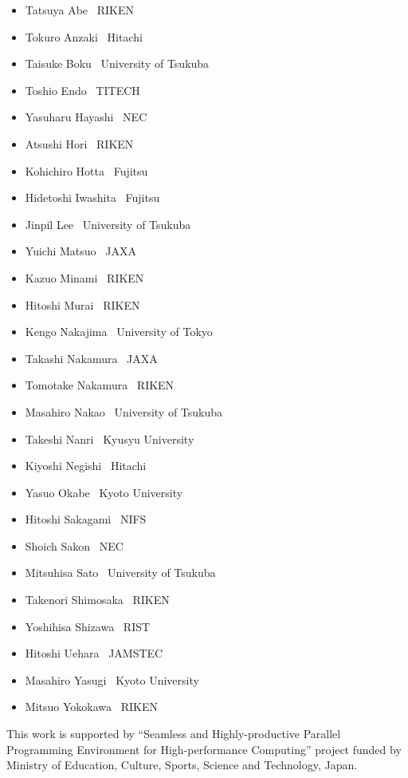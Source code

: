 \documentclass[a4paper,11pt]{report}
\begin{document}
\begin{itemize}
\setlength{\itemsep}{-1mm}
\item Tatsuya Abe        \dotfill \ RIKEN
\item Tokuro Anzaki      \dotfill \ Hitachi
\item Taisuke Boku       \dotfill \ University of Tsukuba
\item Toshio Endo        \dotfill \ TITECH
\item Yasuharu Hayashi   \dotfill \ NEC
\item Atsushi Hori       \dotfill \ RIKEN
\item Kohichiro Hotta    \dotfill \ Fujitsu
\item Hidetoshi Iwashita \dotfill \ Fujitsu
\item Jinpil Lee         \dotfill \ University of Tsukuba
\item Yuichi Matsuo      \dotfill \ JAXA
\item Kazuo Minami       \dotfill \ RIKEN
\item Hitoshi Murai      \dotfill \ RIKEN
\item Kengo Nakajima     \dotfill \ University of Tokyo
\item Takashi Nakamura   \dotfill \ JAXA
\item Tomotake Nakamura  \dotfill \ RIKEN
\item Masahiro Nakao     \dotfill \ University of Tsukuba
\item Takeshi Nanri      \dotfill \ Kyusyu University
\item Kiyoshi Negishi    \dotfill \ Hitachi
\item Yasuo Okabe        \dotfill \ Kyoto University
\item Hitoshi Sakagami   \dotfill \ NIFS
\item Shoich Sakon       \dotfill \ NEC
\item Mitsuhisa Sato     \dotfill \ University of Tsukuba
\item Takenori Shimosaka \dotfill \ RIKEN
\item Yoshihisa Shizawa  \dotfill \ RIST
\item Hitoshi Uehara     \dotfill \ JAMSTEC
\item Masahiro Yasugi    \dotfill \ Kyoto University
\item Mitsuo Yokokawa    \dotfill \ RIKEN
\end{itemize}

This work is supported by ``Seamless and Highly-productive Parallel
Programming Environment for High-performance Computing'' project funded
by Ministry of Education, Culture, Sports, Science and Technology,
Japan.
\end{document}
